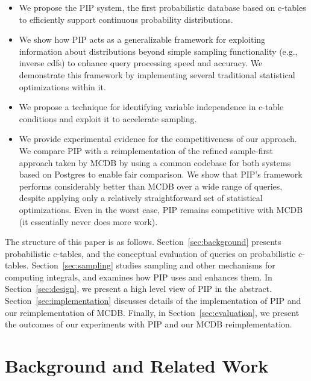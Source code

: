 \begin{itemize}
\item We propose the PIP system, the first probabilistic database based on c-tables to efficiently support continuous probability distributions.

\item We show how PIP acts as a generalizable framework for exploiting information about distributions beyond simple sampling functionality (e.g., inverse cdfs) to enhance query processing speed and accuracy.  We demonstrate this framework by implementing several traditional statistical optimizations within it.

\item We propose a technique for identifying variable independence in c-table conditions and exploit it to accelerate sampling.

\item
We provide experimental evidence for the competitiveness of our approach.  We compare PIP with a reimplementation of the refined sample-first approach taken by MCDB by using a common codebase for both systems based on Postgres to enable fair comparison.  We show that PIP's framework performs considerably better than MCDB over a wide range of queries, despite applying only a relatively straightforward set of statistical optimizations.  Even in the worst case, PIP remains competitive with MCDB (it essentially never does more work).

\end{itemize}

The structure of this paper is as follows. Section~\ref{sec:background} presents probabilistic c-tables, and the conceptual  evaluation of queries on probabilistic c-tables. Section~\ref{sec:sampling} studies sampling and other mechanisms for computing integrals, and examines how PIP uses and enhances them.  In Section~\ref{sec:design}, we present a high level view of PIP in the abstract.   Section~\ref{sec:implementation} discusses details of the implementation of PIP and our reimplementation of MCDB.  Finally, in Section~\ref{sec:evaluation}, we present the outcomes of our experiments with PIP and our MCDB reimplementation.

\section{Background and Related Work}

